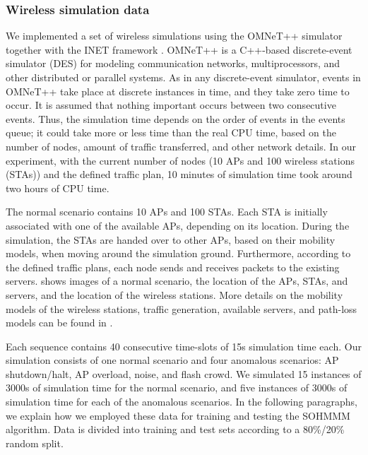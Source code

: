\subsubsection{Wireless simulation data}
\label{sec:sohmmm_experiment_wifi}

We implemented a set of wireless simulations using the OMNeT++ \cite{omnetpp} simulator together with the INET framework \cite{inet}. OMNeT++ is a C++-based discrete-event simulator (DES) for modeling communication networks, multiprocessors, and other distributed or parallel systems.
As in any discrete-event simulator, events in OMNeT++ take place at discrete instances in time, and they take zero time to occur. It is assumed that nothing important occurs between two consecutive events. Thus, the simulation time depends on the order of events in the events queue; it could take more or less time than the real CPU time, based on the number of nodes, amount of traffic transferred, and other network details. In our experiment, with the current number of nodes (10 APs and 100 wireless stations (STAs)) and the defined traffic plan, 10 minutes of simulation time took around two hours of CPU time.

The normal scenario contains 10 APs and 100 STAs. Each STA is initially associated with one of the available APs, depending on its location. During the simulation, the STAs are handed over to other APs, based on their mobility models, when moving around the simulation ground. Furthermore, according to the defined traffic plans, each node sends and receives packets to the existing servers.  shows images of a normal scenario, the location of the APs, STAs, and servers, and the location of the wireless stations. More details on the mobility models of the wireless stations, traffic generation, available servers, and path-loss models can be found in \cite{Anisa2017}.

Each sequence contains 40 consecutive time-slots of 15s simulation time each. Our simulation consists of one normal scenario and four anomalous scenarios: AP shutdown/\allowbreak halt, AP overload, noise, and flash crowd. We simulated 15 instances of 3000s of simulation time for the normal scenario, and five instances of 3000s of simulation time for each of the anomalous scenarios. In the following paragraphs, we explain how we employed these data for training and testing the SOHMMM algorithm.
Data is divided into training and test sets according to a 80\%/20\% random split.

